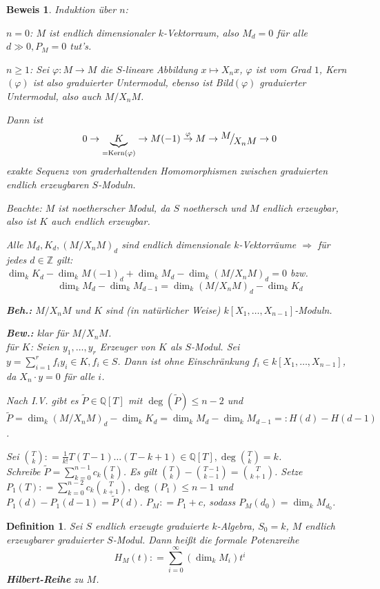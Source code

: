 \documentclass[a4paper,12pt]{scrbook}
\theoremstyle{break}
\newtheorem{Def}{Definition}[chapter]
\theoremstyle{nonumberbreak}
\newtheorem{Bew}{Beweis}
\theoremstyle{nonumberplain}
\newcommand{\emp}[1]{\textbf{\emph{#1}}}
\newcommand{\defeqr}[0]{\mathrel{\mathop:}=}
\newcommand{\defeql}[0]{=\mathrel{\mathop:}}
\DeclareMathOperator{\Kern}{Kern}
\newcommand{\FakRaum}[2]{
  \raisebox{0.7ex}{\ensuremath{#1}}
  \ensuremath{\mkern-3mu}\big/\ensuremath{\mkern-3mu}
  \raisebox{-0.6ex}{\ensuremath{#2}}}
\begin{document}
\begin{Bew}
  Induktion über $n$:

  $n=0$: $M$ ist endlich dimensionaler $k$-Vektorraum, also $M_d=0$ für alle $d
  \gg 0, P_M = 0$ tut's.

  $n\geq1$: Sei $\varphi: M \to M$ die $S$-lineare Abbildung $x \mapsto X_n x$,
  $\varphi$ ist vom Grad $1$, Kern$(\varphi)$ ist also graduierter Untermodul,
  ebenso ist Bild$(\varphi)$ graduierter Untermodul, also auch $M/X_n M$.

  Dann ist \[ 0 \to \underset{=\Kern(\varphi)}{\underbrace{K}} \to M(-1) \overset{\varphi}{\to} M \to \FakRaum{M}{X_n M} \to 0 \]
  exakte Sequenz von graderhaltenden Homomorphismen zwischen graduierten endlich
  erzeugbaren $S$-Moduln.

  Beachte: $M$ ist noetherscher Modul, da $S$ noethersch und $M$ endlich
  erzeugbar, also ist $K$ auch endlich erzeugbar.

  Alle $M_d, K_d,(M/X_n M)_d$ sind endlich dimensionale $k$-Vektorräume
  $\Rightarrow$ für jedes $d \in \mathbb{Z}$ gilt: $\dim_k K_d -
  \dim_k M(-1)_d + \dim_k M_d - \dim_k (M/X_n M)_d = 0$
  bzw.
  $$\dim_k M_d - \dim_k M_{d-1} = \dim_k (M/X_n M)_d - \dim_k K_d$$

  \textbf{Beh.:} $M/X_n M$ und $K$ sind (in natürlicher Weise) $k[X_1, \dots, X_{n-1}]$-Moduln.

  \textbf{Bew.:} klar für $M/X_n M$.\\
  für $K$: Seien $y_1, \dots, y_r$ Erzeuger von $K$ als $S$-Modul. Sei $y =
  \sum_{i = 1}^r f_i y_i \in K, f_i \in S$. Dann ist ohne Einschränkung $f_i
  \in k[X_1, \dots, X_{n-1}]$, da $X_n \cdot y = 0$ für alle $i$.
  \bigskip

  Nach I.V. gibt es $\tilde{P} \in \mathbb{Q}[T]$ mit $\deg(\tilde{P})
  \le n-2$ und $\tilde{P} = \dim_k (M/X_n M)_d - \dim_k K_d =
  \dim_k M_d - \dim_k M_{d-1} \defeql H(d) - H(d-1)$.

  Sei ${T \choose k} \defeqr \frac{1}{k!} T (T-1) \dots (T-k+1) \in
  \mathbb{Q}[T], \deg{T \choose k} = k$.\\
  Schreibe $\tilde{P} = \sum_{k = 0}^{n-1} c_k {T \choose k}$. Es gilt ${T
  \choose k} - {T-1 \choose k-1} = {T \choose k+1}$. Setze $P_1(T) \defeqr
  \sum_{k=0}^{n-2} c_k {T \choose k+1}, \deg(P_1) \le n-1$ und
  $P_1(d)-P_1(d-1) = \tilde{P}(d)$. $P_M \defeqr P_1 +c$, sodass $P_M(d_0) = \dim_k M_{d_0}$.
\end{Bew}

\begin{Def}
\label{2.18}
Sei $S$ endlich erzeugte graduierte $k$-Algebra, $S_0 = k$, $M$ endlich
erzeugbarer graduierter $S$-Modul. Dann heißt die formale Potenzreihe
$$H_M(t) \defeqr \sum_{i=0}^{\infty} (\dim_k M_i) t^i$$
\emp{Hilbert-Reihe} zu $M$.
\end{Def}
\end{document}
